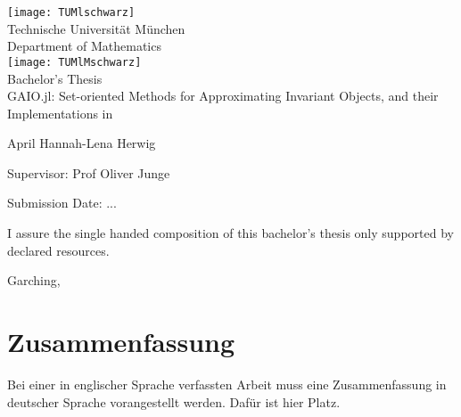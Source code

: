 \pagestyle{empty}
\begin{titlepage}
\begin{center}
\texttt{[image: TUMlschwarz]}\\[3mm]
\sf
{\Large
  Technische Universit\"at M\"unchen\\[5mm]
  Department of Mathematics\\[8mm]
}
\normalsize
\texttt{[image: TUMlMschwarz]}\\[15mm]

Bachelor's Thesis\\[15mm]

{\LARGE
  GAIO.jl: Set-oriented Methods for Approximating Invariant Objects, and their Implementations in {\Huge \julia}
}
\bigskip

\normalsize

April Hannah-Lena Herwig
\end{center}
\vspace*{75mm}

Supervisor: Prof Oliver Junge
\medskip

Submission Date: ... %

\end{titlepage}

\vspace*{150mm}

I assure the single handed composition of this bachelor's thesis only supported by declared resources.
\bigskip

Garching, %
\newpage
\section*{Zusammenfassung}
Bei einer in englischer Sprache verfassten Arbeit muss eine Zusammenfassung in deutscher Sprache vorangestellt werden.
Daf\"ur ist hier Platz.
